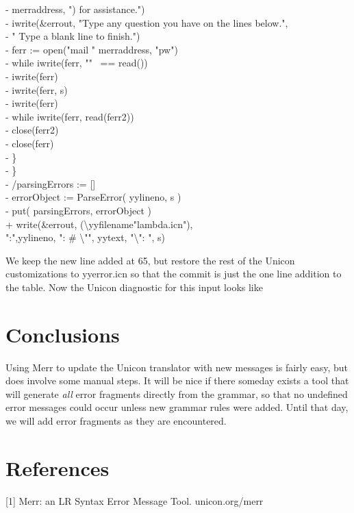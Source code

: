 \documentclass[letterpaper]{article}
\begin{document}
{-	       merraddress, ") for assistance.")\\
-	 iwrite(\&errout, "Type any question you have on the lines below.",\\
-	       " Type a blank line to finish.")\\
-	 ferr := open("mail " {\textbar}{\textbar} merraddress, "pw")\\
-	 while iwrite(ferr, "" ~== read())\\
-	 iwrite(ferr)\\
-	 iwrite(ferr, s)\\
-	 iwrite(ferr)\\
-	 while iwrite(ferr, read(ferr2))\\
-	 close(ferr2)\\
-	 close(ferr)\\
-         \}\\
-      \}\\
-   /parsingErrors := []\\
-   errorObject := ParseError( yylineno, s )\\
-   put( parsingErrors, errorObject )\\
+   write(\&errout, (\textbackslash yyfilename{\textbar}"lambda.icn"),\\
":",yylineno, ": \# \textbackslash "", yytext, "\textbackslash ": ", s)
}

We keep the new line added at 65, but restore the rest of the Unicon
customizations to yyerror.icn so that the commit is just the one line
addition to the table.  Now the Unicon diagnostic for this input
looks like



\section{Conclusions}

Using Merr to update the Unicon translator with new messages is fairly
easy, but does involve some manual steps. It will be nice if there
someday exists a tool that will generate {\em all\/} error fragments
directly from the grammar, so that no undefined error messages could
occur unless new grammar rules were added. Until that day, we will add
error fragments as they are encountered.

\section*{References}

[1] Merr: an LR Syntax Error Message Tool. unicon.org/merr
\end{document}
